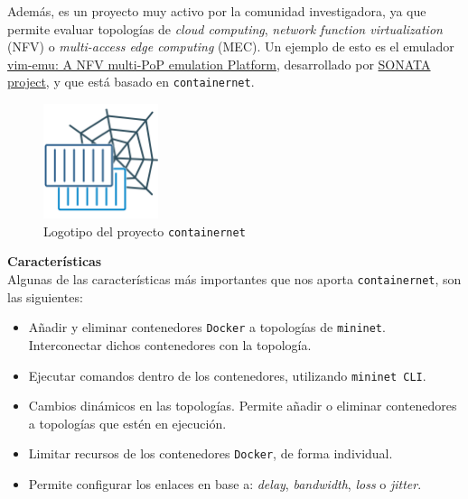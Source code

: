 \documentclass[a4paper, oneside, 12pt]{book}
\begin{document}
	\noindent Además, es un proyecto muy activo por la comunidad investigadora, ya que permite evaluar topologías de \textit{cloud computing}, \textit{network function virtualization} (NFV) o \textit{multi-access edge computing} (MEC). Un ejemplo de esto es el emulador \href{https://github.com/containernet/vim-emu}{vim-emu: A NFV multi-PoP emulation Platform}, desarrollado por \href{https://www.sonata-nfv.eu/}{SONATA project}, y que está basado en \texttt{containernet}.
	
	\begin{figure}[h!]
		\begin{center}
			\includegraphics[width=0.3\textwidth]{img/containernet_logo.png}
			\caption{Logotipo del proyecto \texttt{containernet}}	
			\label{img: containernet logo}
		\end{center}
	\end{figure}

	\vspace{10px}
	
	\noindent \textbf{\large Características}\\
	
	\noindent Algunas de las características más importantes que nos aporta \texttt{containernet}, son las siguientes:
	
	\begin{itemize}
		\item Añadir y eliminar contenedores \texttt{Docker} a topologías de \texttt{mininet}. Interconectar dichos contenedores con la topología.
		
		\item Ejecutar comandos dentro de los contenedores, utilizando \texttt{mininet CLI}.
		
		\item Cambios dinámicos en las topologías. Permite añadir o eliminar contenedores a topologías que estén en ejecución.
		
		\item Limitar recursos de los contenedores \texttt{Docker}, de forma individual.
		
		\item Permite configurar los enlaces en base a: \textit{delay}, \textit{bandwidth}, \textit{loss} o \textit{jitter}.
	\end{itemize}
	
\end{document}
